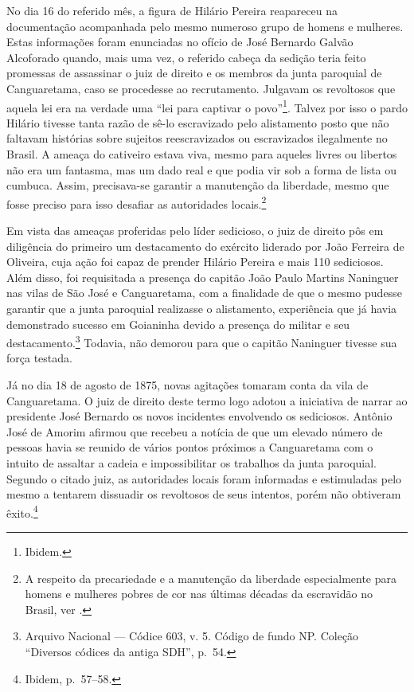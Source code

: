 \begin{refsection}
No dia 16 do referido mês, a figura de Hilário Pereira reapareceu na documentação acompanhada pelo mesmo numeroso grupo de homens e mulheres. Estas informações foram enunciadas no ofício de José Bernardo Galvão Alcoforado quando, mais uma vez, o referido cabeça da sedição teria feito promessas de assassinar o juiz de direito e os membros da junta paroquial de Canguaretama, caso se procedesse ao recrutamento. Julgavam os revoltosos que aquela lei era na verdade uma “lei para captivar o povo”\footnote{Ibidem.}. Talvez por isso o pardo Hilário tivesse tanta razão de sê-lo escravizado pelo alistamento posto que não faltavam histórias sobre sujeitos reescravizados ou escravizados ilegalmente no Brasil. A ameaça do cativeiro estava viva, mesmo para aqueles livres ou libertos não era um fantasma, mas um dado real e que podia vir sob a forma de lista ou cumbuca. Assim, precisava-se garantir a manutenção da liberdade, mesmo que fosse preciso para isso desafiar as autoridades locais.\footnote{A respeito da precariedade e a manutenção da liberdade especialmente para homens e mulheres pobres de cor nas últimas décadas da escravidão no Brasil, ver .}

Em vista das ameaças proferidas pelo líder sedicioso, o juiz de direito pôs em diligência do primeiro um destacamento do exército liderado por João Ferreira de Oliveira, cuja ação foi capaz de prender Hilário Pereira e mais 110 sediciosos. Além disso, foi requisitada a presença do capitão João Paulo Martins Naninguer nas vilas de São José e Canguaretama, com a finalidade de que o mesmo pudesse garantir que a junta paroquial realizasse o alistamento, experiência que já havia demonstrado sucesso em Goianinha devido a presença do militar e seu destacamento.\footnote{Arquivo Nacional --- Códice 603, v. 5. Código de fundo NP. Coleção “Diversos códices da antiga SDH”, p.~54.} Todavia, não demorou para que o capitão Naninguer tivesse sua força testada.

Já no dia 18 de agosto de 1875, novas agitações tomaram conta da vila de Canguaretama. O juiz de direito deste termo logo adotou a iniciativa de narrar ao presidente José Bernardo os novos incidentes envolvendo os sediciosos. Antônio José de Amorim afirmou que recebeu a notícia de que um elevado número de pessoas havia se reunido de vários pontos próximos a Canguaretama com o intuito de assaltar a cadeia e impossibilitar os trabalhos da junta paroquial. Segundo o citado juiz, as autoridades locais foram informadas e estimuladas pelo mesmo a tentarem dissuadir os revoltosos de seus intentos, porém não obtiveram êxito.\footnote{Ibidem, p.~57--58.}


\end{refsection}
